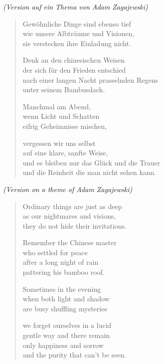 
\cleartoverso


\emph{(Version auf ein Thema von Adam Zagajewski)}

\begin{verse}

Gewöhnliche Dinge sind ebenso tief\\
wie unsere Albträume und Visionen,\\
sie verstecken ihre Einladung nicht.

Denk an den chinesischen Weisen\\
der sich für den Frieden entschied\\
nach einer langen Nacht prasselnden Regens\\
unter seinem Bambusdach.

Manchmal am Abend,\\
wenn Licht und Schatten\\
eifrig Geheimnisse mischen,

vergessen wir uns selbst\\
auf eine klare, sanfte Weise,\\
und es bleiben nur das Glück und die Trauer\\
und die Reinheit die man nicht sehen kann.

\end{verse}

\clearpage


\emph{(Version on a theme of Adam Zagajewski)}

\begin{verse}

Ordinary things are just as deep\\
as our nightmares and visions,\\
they do not hide their invitations.

Remember the Chinese master\\
who settled for peace\\
after a long night of rain\\
pattering his bamboo roof.

Sometimes in the evening\\
when both light and shadow\\
are busy shuffling mysteries

we forget ourselves in a lucid\\
gentle way and there remain\\
only happiness and sorrow\\
and the purity that can't be seen.

\end{verse}
